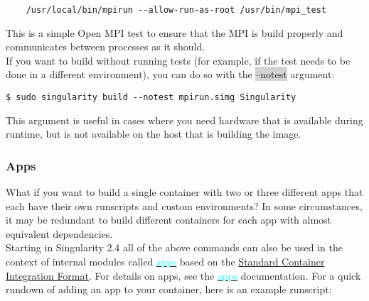 \documentclass[a4paper]{article}
\begin{document}
\begin{lstlisting}[frame=single] 
%test
    /usr/local/bin/mpirun --allow-run-as-root /usr/bin/mpi_test
\end{lstlisting}


This is a simple Open MPI test to ensure that the MPI is build properly and communicates between processes as it should.\\[0.1in]

If you want to build without running tests (for example, if the test needs to be done in a different environment), you can do so with the \colorbox{lightgray}{ --notest} argument:\\[0.1in]


\begin{lstlisting}[frame=single] 
$ sudo singularity build --notest mpirun.simg Singularity
\end{lstlisting}

This argument is useful in cases where you need hardware that is available during runtime, but is not available on the host that is building the image.

\subsubsection{Apps}

What if you want to build a single container with two or three different apps that each have their own runscripts and custom environments? In some circumstances, it may be redundant to build different containers for each app with almost equivalent dependencies.\\[0.1in]

Starting in Singularity 2.4 all of the above commands can also be used in the context of internal modules called \hyperref[sec:scifapps]{{\textcolor{cyan}{apps}}}  based on the \href{https://sci-f.github.io/}{Standard Container Integration Format}. For details on apps, see the \hyperref[sec:scifapps]{{\textcolor{cyan}{apps}}} documentation. For a quick rundown of adding an app to your container, here is an example runscript:
\end{document}
